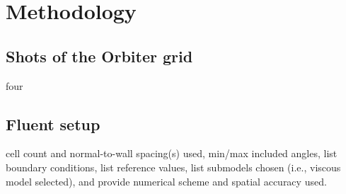 \section{Methodology}

\subsection{Shots of the Orbiter grid}

four

\subsection{Fluent setup}

cell count and normal-to-wall spacing(s) used, min/max included angles, list boundary conditions, list reference values, list submodels chosen (i.e., viscous model selected), and provide numerical scheme and spatial accuracy used.